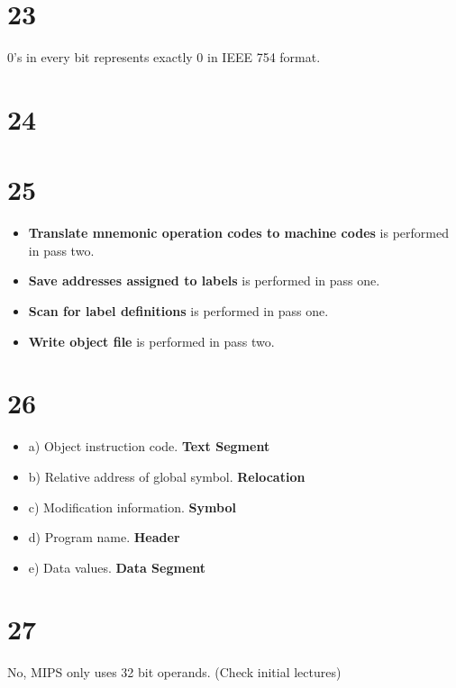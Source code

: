 \documentclass[a4paper,11pt]{article}
\begin{document}
\section*{23}
0's in every bit represents exactly 0 in IEEE 754 format.


\section*{24}


\section*{25}
\begin{itemize}
  \item {\bf Translate mnemonic operation codes to machine codes} is performed in pass two.
  \item {\bf Save addresses assigned to labels} is performed in pass one. 
  \item {\bf Scan for label definitions} is performed in pass one.
  \item {\bf Write object file} is performed in pass two.
\end{itemize}



\section*{26}
\begin{itemize}
  \item a) Object instruction code. {\bf Text Segment}
  \item b) Relative address of global symbol.  {\bf Relocation}
  \item c) Modification information. {\bf Symbol}
  \item d) Program name.  {\bf Header}  
  \item e) Data values. {\bf Data Segment}
\end{itemize}



\section*{27}
No, MIPS only uses 32 bit operands.  (Check initial lectures)
\end{document}
